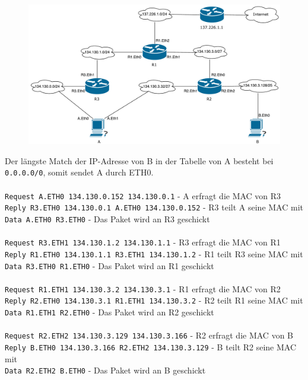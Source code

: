\documentclass{../exercisesheet}
\begin{document}
\begin{exercise}{5}
\begin{subexercise}
\begin{figure}[H]
  \centering
  \includegraphics[width=\textwidth]{a3_network.pdf}
\end{figure}
\end{subexercise}
\begin{subexercise}
Der längste Match der IP-Adresse von B in der Tabelle von A besteht bei \texttt{0.0.0.0/0}, somit sendet A durch ETH0.\\ \ \\
\texttt{Request A.ETH0 134.130.0.152 134.130.0.1} - A erfragt die MAC von R3\\
\texttt{Reply R3.ETH0 134.130.0.1 A.ETH0 134.130.0.152} - R3 teilt A seine MAC mit\\
\texttt{Data A.ETH0 R3.ETH0} - Das Paket wird an R3 geschickt\\
\ \\
\texttt{Request R3.ETH1 134.130.1.2 134.130.1.1} - R3 erfragt die MAC von R1\\
\texttt{Reply R1.ETH0 134.130.1.1 R3.ETH1 134.130.1.2} - R1 teilt R3 seine MAC mit\\
\texttt{Data R3.ETH0 R1.ETH0} - Das Paket wird an R1 geschickt\\
\ \\
\texttt{Request R1.ETH1 134.130.3.2 134.130.3.1} - R1 erfragt die MAC von R2\\
\texttt{Reply R2.ETH0 134.130.3.1 R1.ETH1 134.130.3.2} - R2 teilt R1 seine MAC mit\\
\texttt{Data R1.ETH1 R2.ETH0} - Das Paket wird an R2 geschickt\\
\ \\
\texttt{Request R2.ETH2 134.130.3.129 134.130.3.166} - R2 erfragt die MAC von B\\
\texttt{Reply B.ETH0 134.130.3.166 R2.ETH2 134.130.3.129} - B teilt R2 seine MAC mit\\
\texttt{Data R2.ETH2 B.ETH0} - Das Paket wird an B geschickt\\
\end{subexercise}
\end{exercise}
\end{document}

